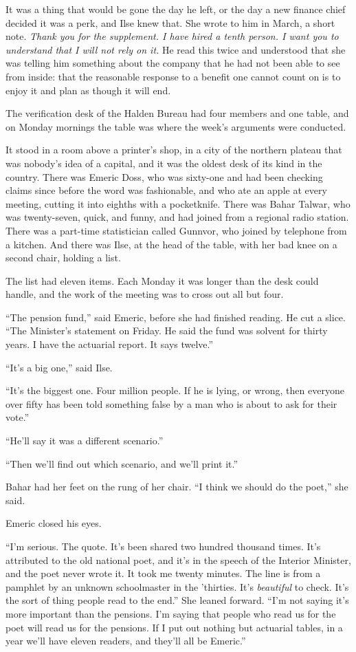 It was a thing that would be gone the day he left, or the day a new finance chief decided it was a perk, and Ilse knew that. She wrote to him in March, a short note. \emph{Thank you for the supplement. I have hired a tenth person. I want you to understand that I will not rely on it.} He read this twice and understood that she was telling him something about the company that he had not been able to see from inside: that the reasonable response to a benefit one cannot count on is to enjoy it and plan as though it will end.

\scenebreak
\noindent The verification desk of the Halden Bureau had four members and one table, and on Monday mornings the table was where the week's arguments were conducted.

It stood in a room above a printer's shop, in a city of the northern plateau that was nobody's idea of a capital, and it was the oldest desk of its kind in the country. There was Emeric Doss, who was sixty-one and had been checking claims since before the word was fashionable, and who ate an apple at every meeting, cutting it into eighths with a pocketknife. There was Bahar Talwar, who was twenty-seven, quick, and funny, and had joined from a regional radio station. There was a part-time statistician called Gunnvor, who joined by telephone from a kitchen. And there was Ilse, at the head of the table, with her bad knee on a second chair, holding a list.

The list had eleven items. Each Monday it was longer than the desk could handle, and the work of the meeting was to cross out all but four.

``The pension fund,'' said Emeric, before she had finished reading. He cut a slice. ``The Minister's statement on Friday. He said the fund was solvent for thirty years. I have the actuarial report. It says twelve.''

``It's a big one,'' said Ilse.

``It's the biggest one. Four million people. If he is lying, or wrong, then everyone over fifty has been told something false by a man who is about to ask for their vote.''

``He'll say it was a different scenario.''

``Then we'll find out which scenario, and we'll print it.''

Bahar had her feet on the rung of her chair. ``I think we should do the poet,'' she said.

Emeric closed his eyes.

``I'm serious. The quote. It's been shared two hundred thousand times. It's attributed to the old national poet, and it's in the speech of the Interior Minister, and the poet never wrote it. It took me twenty minutes. The line is from a pamphlet by an unknown schoolmaster in the 'thirties. It's \emph{beautiful} to check. It's the sort of thing people read to the end.'' She leaned forward. ``I'm not saying it's more important than the pensions. I'm saying that people who read us for the poet will read us for the pensions. If I put out nothing but actuarial tables, in a year we'll have eleven readers, and they'll all be Emeric.''

